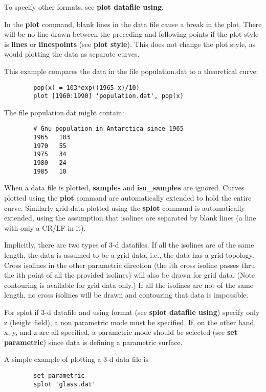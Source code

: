 To specify other formats, see {\bf plot datafile using}.

In the {\bf plot} command, blank lines in the data file cause a break in
the plot. There will be no line drawn between the preceding and
following points if the plot style is {\bf lines} or {\bf linespoints} (see
{\bf plot style}). This does not change the plot style, as would plotting
the data as separate curves.

This example compares the data in the file population.dat to a
theoretical curve:

\begin{verbatim}
        pop(x) = 103*exp((1965-x)/10)
        plot [1960:1990] 'population.dat', pop(x)
\end{verbatim}

The file population.dat might contain:

\begin{verbatim}
        # Gnu population in Antarctica since 1965
        1965   103
        1970   55
        1975   34
        1980   24
        1985   10
\end{verbatim}

When a data file is plotted, {\bf samples} and {\bf iso\_samples} are ignored.
Curves plotted using the {\bf plot} command are automatically extended to
hold the entire curve. Similarly grid data plotted using the {\bf splot}
command is automatically extended, using the assumption that isolines
are separated by blank lines (a line with only a CR/LF in it).

Implicitly, there are two types of 3-d datafiles. If all the isolines
are of the same length, the data is assumed to be a grid data, i.e.,
the data has a grid topology. Cross isolines in the other parametric
direction (the ith cross isoline passes thru the ith point of all the
provided isolines) will also be drawn for grid data. (Note contouring
is available for grid data only.) If all the isolines are not of the
same length, no cross isolines will be drawn and contouring that data
is impossible.

For splot if 3-d datafile and using format (see {\bf splot datafile using})
specify only z (height field), a non parametric mode must be specified.
If, on the other hand, x, y, and z are all specified, a parametric
mode should be selected (see {\bf set parametric}) since data is defining a
parametric surface.

A simple example of plotting a 3-d data file is

\begin{verbatim}
        set parametric
        splot 'glass.dat'
\end{verbatim}

